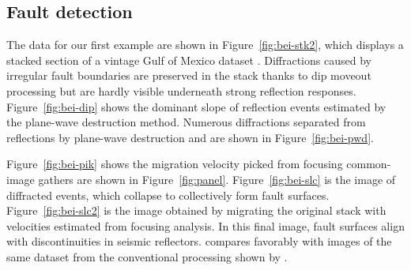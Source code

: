 \subsection{Fault detection}



The data for our first example are shown in Figure~\ref{fig:bei-stk2},
which displays a stacked section of a vintage Gulf of Mexico dataset
\cite[]{Claerbout.bei.95}. Diffractions caused by irregular fault
boundaries are preserved in the stack thanks to dip moveout processing
but are hardly visible underneath strong reflection
responses. Figure~\ref{fig:bei-dip} shows the dominant slope of
reflection events estimated by the plane-wave destruction
method. Numerous diffractions   separated from
reflections by plane-wave destruction and are shown in
Figure~\ref{fig:bei-pwd}.

Figure~\ref{fig:bei-pik} shows the migration
velocity picked from focusing common-image gathers  are
 shown in Figure~\ref{fig:panel}. Figure~\ref{fig:bei-slc}
is the image of diffracted events, which collapse to collectively form
fault surfaces. Figure~\ref{fig:bei-slc2} is the image obtained by
migrating the original stack with velocities estimated from
 focusing analysis. In this final image, fault
surfaces align with discontinuities in seismic reflectors. 
 compares favorably with images of the same dataset
from the conventional processing shown by \cite{Claerbout.bei.95}.

